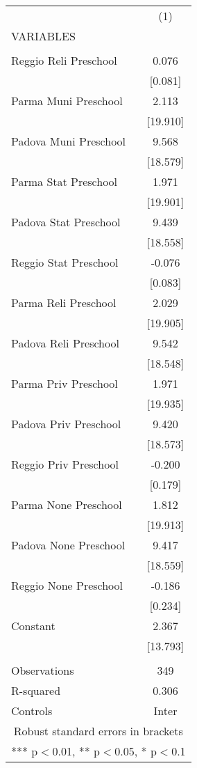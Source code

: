 \begin{tabular}{lc} \hline
 & (1) \\
VARIABLES &  \\ \hline
 &  \\
Reggio Reli Preschool & 0.076 \\
 & [0.081] \\
Parma Muni Preschool & 2.113 \\
 & [19.910] \\
Padova Muni Preschool & 9.568 \\
 & [18.579] \\
Parma Stat Preschool & 1.971 \\
 & [19.901] \\
Padova Stat Preschool & 9.439 \\
 & [18.558] \\
Reggio Stat Preschool & -0.076 \\
 & [0.083] \\
Parma Reli Preschool & 2.029 \\
 & [19.905] \\
Padova Reli Preschool & 9.542 \\
 & [18.548] \\
Parma Priv Preschool & 1.971 \\
 & [19.935] \\
Padova Priv Preschool & 9.420 \\
 & [18.573] \\
Reggio Priv Preschool & -0.200 \\
 & [0.179] \\
Parma None Preschool & 1.812 \\
 & [19.913] \\
Padova None Preschool & 9.417 \\
 & [18.559] \\
Reggio None Preschool & -0.186 \\
 & [0.234] \\
Constant & 2.367 \\
 & [13.793] \\
 &  \\
Observations & 349 \\
R-squared & 0.306 \\
 Controls & Inter \\ \hline
\multicolumn{2}{c}{ Robust standard errors in brackets} \\
\multicolumn{2}{c}{ *** p$<$0.01, ** p$<$0.05, * p$<$0.1} \\
\end{tabular}
